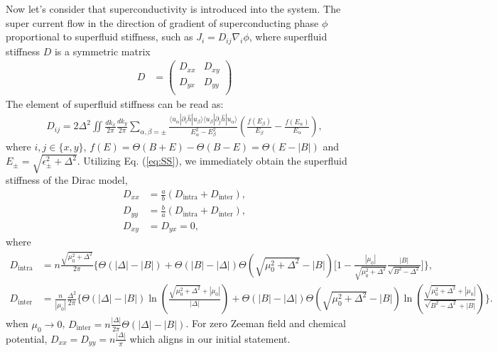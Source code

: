 \documentclass{article}
\begin{document}
Now let's consider that superconductivity is introduced into the system. The super current flow in the direction of gradient of superconducting phase $ \phi $ proportional to superfluid stiffness, such as $ J_{i}=D_{ij}\nabla_i \phi$, where superfluid stiffness $ D $ is a symmetric matrix
\begin{align}
    D & = \left(\begin{array}{cc}
        D_{xx}  & D_{xy}    \\
        D_{yx}  & D_{yy}   \\
    \end{array}\right)
\end{align}
The element of superfluid stiffness can be read as:
\begin{align}
    D_{ij} = 2\Delta^2 \iint \frac{dk_x}{2\pi} \frac{dk_y}{2\pi} \sum_{\alpha,\beta=\pm} \frac{\langle u_{\alpha}|\partial_{i} \hat{h}|u_{\beta}\rangle\langle u_{\beta}|\partial_{j} \hat{h}|u_{\alpha}\rangle}{E_\alpha^2 - E_\beta^2} \left(\frac{f(E_\beta)}{E_\beta} - \frac{f(E_\alpha)}{E_\alpha} \right),\label{eq:SS}
\end{align} 
where $ i,j \in \{x,y\} $, $ f(E) = \Theta(B+E)-\Theta(B-E)=\Theta(E-\left\vert B \right\vert ) $ and $ E_\pm = \sqrt{\epsilon_\pm^2 + \Delta^2}  $. Utilizing Eq. (\ref{eq:SS}), we immediately obtain the superfluid stiffness of the Dirac model,
\begin{align}
    D_{xx}  &=\frac{a}{b} (D_{\textrm{intra}} + D_{\textrm{inter}}),\\ \label{eq:Dxx }
    D_{yy}  &=\frac{b}{a} (D_{\textrm{intra}} + D_{\textrm{inter}}),\\ \label{eq:Dyy }
    D_{xy} &= D_{yx} = 0,
\end{align}
where
\begin{align*}
    D_{\textrm{intra}} &=  n \frac{\sqrt{\mu_0^2+\Delta^2}}{2\pi}\Bigg\{ \Theta(|\Delta|-|B|)+\Theta(|B|-|\Delta|)\Theta(\sqrt{\mu_0^2+\Delta^2}-|B|) \bigg[1-\frac{|\mu_0|}{\sqrt{\mu_0^2+\Delta^2}}\frac{|B|}{\sqrt{B^2-\Delta^2}}\bigg]\Bigg\},\\
    D_{\textrm{inter}} &= \frac{n}{|\mu_0|}\frac{\Delta^2}{2\pi} \Bigg\{ \Theta(|\Delta|-|B|)\ln(\frac{\sqrt{\mu_0^2+\Delta^2}+|\mu_0|}{|\Delta|})+\Theta(|B|-|\Delta|)\Theta(\sqrt{\mu_0^2+\Delta^2}-|B|)\ln(\frac{\sqrt{\mu_0^2+\Delta^2}+|\mu_0|}{\sqrt{B^2-\Delta^2}+|B|}) \Bigg\}.    
\end{align*}
when $\mu_0 \to 0$, $D_{\textrm{inter}}=n\frac{|\Delta|}{2\pi}\Theta(|\Delta|-|B|) $. For zero Zeeman field and chemical potential, $ D_{xx}=D_{yy} = n \frac{\left\vert \Delta \right\vert}{\pi}     $ which aligns in our initial statement. 
\end{document}
